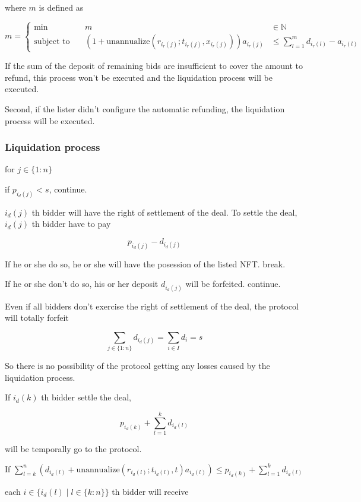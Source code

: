\documentclass[dvipdfmx]{jsarticle}
\begin{document}
where $m$ is defined as

$$
  m = \left\{\begin{aligned}
    \min && \ m & \in \mathbb{N} \\
    \text{subject to} && \ (1 + \text{unannualize}(r_{i_r(j)}; t_{i_r(j)}, x_{i_r(j)})) a_{i_r(j)} & \le \sum_{l=1}^m {d_{i_r(l)} - a_{i_r(l)}}
  \end{aligned}\right.
$$

If the sum of the deposit of remaining bids are insufficient to cover the amount to refund, this process won't be executed and the liquidation process will be executed.

Second, if the lister didn't configure the automatic refunding, the liquidation process will be executed.

\subsubsection{Liquidation process}

for $j \in \{1:n\}$

if $p_{i_d(j)} < s$, continue.

$i_d(j)$ th bidder will have the right of settlement of the deal.
To settle the deal, $i_d(j)$ th bidder have to pay

$$
  p_{i_d(j)} - d_{i_d(j)}
$$

If he or she do so, he or she will have the posession of the listed NFT. break.

If he or she don't do so, his or her deposit $d_{i_d(j)}$ will be forfeited. continue.

Even if all bidders don't exercise the right of settlement of the deal,
the protocol will totally forfeit 

$$
  \sum_{j \in \{1:n\}} d_{i_d(j)} = \sum_{i \in I} d_i = s
$$

So there is no possibility of the protocol getting any losses caused by the liquidation process.

If $i_d(k)$ th bidder settle the deal,

$$
  p_{i_d(k)} + \sum_{l=1}^k d_{i_d(l)}
$$

will be temporally go to the protocol.

If $\sum_{l=k}^n \left(d_{i_d(l)} + \text{unannualize}(r_{i_d(l)}; t_{i_d(l)}, t) a_{i_d(l)} \right) \le p_{i_d(k)} + \sum_{l=1}^k d_{i_d(l)}$

each $i \in \{i_d(l) \mid l \in \{k:n\}\}$ th bidder will receive
\end{document}
